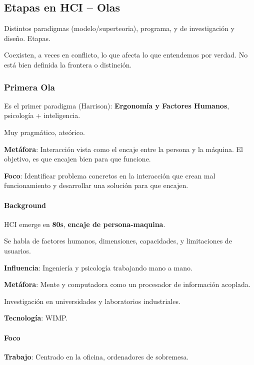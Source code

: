 \hypertarget{etapas-en-hci-olas}{%
\subsection{Etapas en HCI -- Olas}\label{etapas-en-hci-olas}}

Distintos paradigmas (modelo/superteoria), programa, y de investigación
y diseño. Etapas.

Coexisten, a veces en conflicto, lo que afecta lo que entendemos por
verdad. No está bien definida la frontera o distinción.

\hypertarget{primera-ola}{%
\subsubsection{Primera Ola}\label{primera-ola}}

Es el primer paradigma (Harrison): \textbf{Ergonomía y Factores
Humanos}, psicología + inteligencia.

Muy pragmático, ateórico.

\textbf{Metáfora}: Interacción vista como el encaje entre la persona y
la máquina. El objetivo, es que encajen bien para que funcione.

\textbf{Foco}: Identificar problema concretos en la interacción que
crean mal funcionamiento y desarrollar una solución para que encajen.

\hypertarget{background}{%
\paragraph{Background}\label{background}}

HCI emerge en \textbf{80s}, \textbf{encaje de persona-maquina}.

Se habla de factores humanos, dimensiones, capacidades, y limitaciones
de usuarios.

\textbf{Influencia}: Ingeniería y psicología trabajando mano a mano.

\textbf{Metáfora}: Mente y computadora como un procesador de información
acoplada.

Investigación en universidades y laboratorios industriales.

\textbf{Tecnología}: WIMP.

\hypertarget{foco}{%
\paragraph{Foco}\label{foco}}

\textbf{Trabajo}: Centrado en la oficina, ordenadores de sobremesa.

